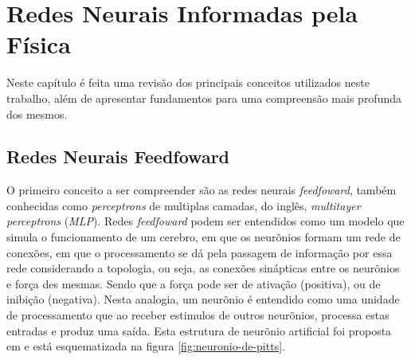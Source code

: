 \chapter{Redes Neurais Informadas pela Física}
\label{sec-pinns}

Neste capítulo é feita uma revisão dos principais conceitos utilizados neste
trabalho, além de apresentar fundamentos para uma compreensão mais profunda dos
mesmos.

\section{Redes Neurais Feedfoward}

O primeiro conceito a ser compreender são as redes neurais \textit{feedfoward},
também conhecidas como \textit{perceptrons} de multiplas camadas, do inglês,
\textit{multitayer perceptrons} (\textit{MLP}). Redes \textit{feedfoward} 
podem ser entendidos como um modelo que simula o funcionamento de um cerebro,
em que os neurõnios formam um rede de conexões, em que o processamento se dá
pela passagem de informação por essa rede considerando a topologia, ou seja, as
conexões sinápticas entre os neurõnios e força des mesmas. Sendo que a força
pode ser de ativação (positiva), ou de inibição (negativa).
Nesta analogia, um neurõnio é entendido como uma unidade de processamento que 
ao receber estimulos de outros neurõnios, processa estas entradas e 
produz uma saída. Esta estrutura de neurõnio artificial foi proposta em 
\cite{mcculloch-pitts:1943-perceptron} e está esquematizada na figura 
\ref{fig:neuronio-de-pitts}.  

